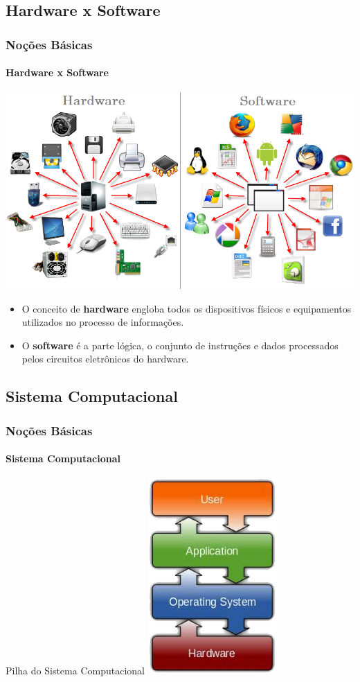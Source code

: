 \documentclass[12pt,a4paper,final]{beamer}
\begin{document}
        \subsection{Hardware x Software}
            \begin{frame}
                \centering
                \frametitle{Noções Básicas}
                \framesubtitle{Hardware x Software}
                \includegraphics[scale=.3]{Imagens/hardSoft.png}
                \begin{itemize}             
                    \item O conceito de \textbf{hardware} engloba todos os dispositivos físicos e equipamentos utilizados no processo de informações.\item O \textbf{software} é a parte lógica, o conjunto de instruções e dados processados pelos circuitos eletrônicos do hardware.
                \end{itemize}
            \end{frame}
            \subsection{Sistema Computacional}
            \begin{frame}
                \frametitle{Noções Básicas}
                \framesubtitle{Sistema Computacional}
                \begin{block}{Pilha do Sistema Computacional}
                    \centering
                    \includegraphics[scale=.5]{Imagens/sistemaComputacional.png}                
                \end{block}
            \end{frame}
            
        
\end{document}
